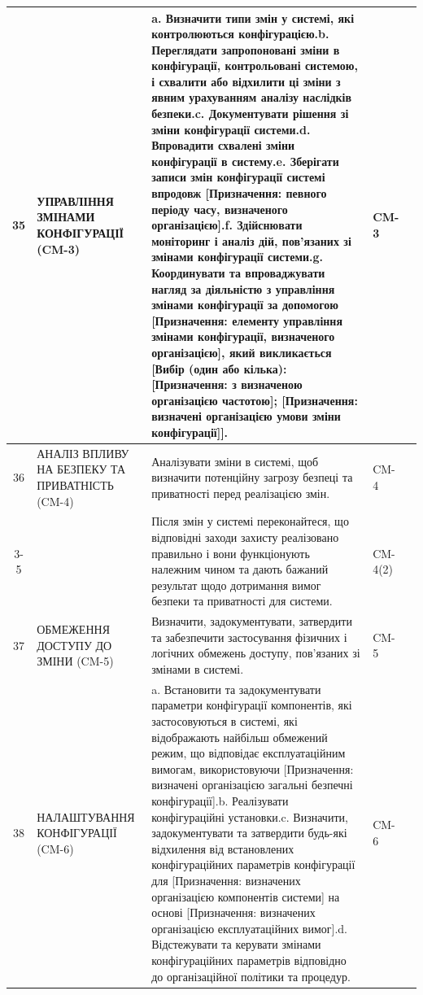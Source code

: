 \documentclass[10pt]{article}
\begin{document}
\begin{longtable}{|c|>{\raggedright\arraybackslash}p{4cm}|>{\raggedright\arraybackslash}p{6cm}|>{\raggedright\arraybackslash}p{1.5cm}|>{\raggedright\arraybackslash}p{3.5cm}|}
35 & УПРАВЛІННЯ ЗМІНАМИ КОНФІГУРАЦІЇ (CM-3) & a. Визначити типи змін у системі, які контролюються конфігурацією.\newline b. Переглядати запропоновані зміни в конфігурації, контрольовані системою, і схвалити або відхилити ці зміни з явним урахуванням аналізу наслідків безпеки.\newline c. Документувати рішення зі зміни конфігурації системи.\newline d. Впровадити схвалені зміни конфігурації в систему.\newline e. Зберігати записи змін конфігурації системі впродовж [Призначення: певного періоду часу, визначеного організацією].\newline f. Здійснювати моніторинг і аналіз дій, пов'язаних зі змінами конфігурації системи.\newline g. Координувати та впроваджувати нагляд за діяльністю з управління змінами конфігурації за допомогою [Призначення: елементу управління змінами конфігурації, визначеного організацією], який викликається [Вибір (один або кілька): [Призначення: з визначеною організацією частотою]; [Призначення: визначені організацією умови зміни конфігурації]]. & CM-3 & \\ \hline
36 & АНАЛІЗ ВПЛИВУ НА БЕЗПЕКУ ТА ПРИВАТНІСТЬ (CM-4) & Аналізувати зміни в системі, щоб визначити потенційну загрозу безпеці та приватності перед реалізацією змін. & CM-4 & \\ \cline{3-5}
 &  & Після змін у системі переконайтеся, що відповідні заходи захисту реалізовано правильно і вони функціонують належним чином та дають бажаний результат щодо дотримання вимог безпеки та приватності для системи. & CM-4(2) & \\ \hline
37 & ОБМЕЖЕННЯ ДОСТУПУ ДО ЗМІНИ (CM-5) & Визначити, задокументувати, затвердити та забезпечити застосування фізичних і логічних обмежень доступу, пов'язаних зі змінами в системі. & CM-5 & \\ \hline
38 & НАЛАШТУВАННЯ КОНФІГУРАЦІЇ (CM-6) & a. Встановити та задокументувати параметри конфігурації компонентів, які застосовуються в системі, які відображають найбільш обмежений режим, що відповідає експлуатаційним вимогам, використовуючи [Призначення: визначені організацією загальні безпечні конфігурації].\newline b. Реалізувати конфігураційні установки.\newline c. Визначити, задокументувати та затвердити будь-які відхилення від встановлених конфігураційних параметрів конфігурації для [Призначення: визначених організацією компонентів системи] на основі [Призначення: визначених організацією експлуатаційних вимог].\newline d. Відстежувати та керувати змінами конфігураційних параметрів відповідно до організаційної політики та процедур. & CM-6 & \\ \hline

\end{longtable}
\end{document}
